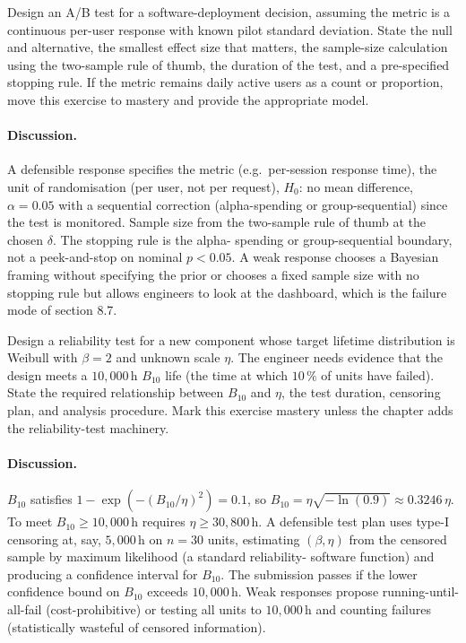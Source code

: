 \begin{exercise}
Design an A/B test for a software-deployment decision, assuming
the metric is a continuous per-user response with known pilot
standard deviation. State the null and alternative, the smallest
effect size that matters, the sample-size calculation using the
two-sample rule of thumb, the duration of the test, and a
pre-specified stopping rule. If the metric remains daily active
users as a count or proportion, move this exercise to mastery and
provide the appropriate model.
\end{exercise}

\paragraph{Discussion.}
A defensible response specifies the metric (e.g.\ per-session
response time), the unit of randomisation (per user, not per
request), $H_{0}$: no mean difference, $\alpha = 0.05$ with a
sequential correction (alpha-spending or group-sequential) since
the test is monitored. Sample size from the two-sample rule of
thumb at the chosen $\delta$. The stopping rule is the alpha-
spending or group-sequential boundary, not a peek-and-stop on
nominal $p < 0.05$. A weak response chooses a Bayesian framing
without specifying the prior or chooses a fixed sample size with
no stopping rule but allows engineers to look at the dashboard,
which is the failure mode of section 8.7.

\begin{exercise}
Design a reliability test for a new component whose target lifetime
distribution is Weibull with $\beta = 2$ and unknown scale $\eta$.
The engineer needs evidence that the design meets a $10{,}000 \,\si
{\hour}$ $B_{10}$ life (the time at which $10 \,\%$ of units have
failed). State the required relationship between $B_{10}$ and
$\eta$, the test duration, censoring plan, and analysis procedure.
Mark this exercise mastery unless the chapter adds the
reliability-test machinery.
\end{exercise}

\paragraph{Discussion.}
$B_{10}$ satisfies $1 - \exp(-(B_{10}/\eta)^{2}) = 0.1$, so $B_{10}
= \eta\sqrt{-\ln(0.9)} \approx 0.3246\,\eta$. To meet $B_{10} \geq
10{,}000 \,\text{h}$ requires $\eta \geq 30{,}800 \,\text{h}$. A
defensible test plan uses type-I censoring at, say, $5{,}000
\,\text{h}$ on $n = 30$ units, estimating $(\beta, \eta)$ from the
censored sample by maximum likelihood (a standard reliability-
software function) and producing a confidence interval for $B_{10}$.
The submission passes if the lower confidence bound on $B_{10}$
exceeds $10{,}000 \,\text{h}$. Weak responses propose
running-until-all-fail (cost-prohibitive) or testing all units to
$10{,}000 \,\text{h}$ and counting failures (statistically wasteful
of censored information).

